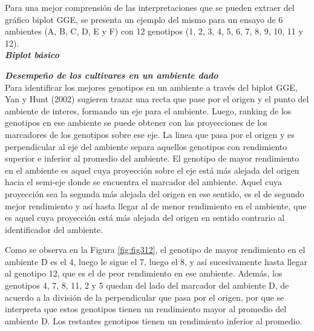 Para una mejor comprensión de las interpretaciones que se pueden extraer del gráfico biplot GGE, se presenta un ejemplo del mismo para un ensayo de 6 ambientes (A, B, C, D, E y F) con 12 genotipos (1, 2, 3, 4, 5, 6, 7, 8, 9, 10, 11 y 12).\\

\textbf{\emph{Biplot básico}}




\textbf{\emph{Desempeño de los cultivares en un ambiente dado}}\\

Para identificar los mejores genotipos en un ambiente a través del biplot GGE, Yan y Hunt (2002) sugieren trazar una recta que pase por el origen y el punto del ambiente de interes, formando un eje para el ambiente. Luego, ranking de los genotipos en ese ambiente se puede obtener con las proyecciones de los marcadores de los genotipos sobre ese eje. La linea que pasa por el origen y es perpendicular al eje del ambiente separa aquellos genotipos con rendimiento superior e inferior al promedio del ambiente. El genotipo de mayor rendimiento en el ambiente es aquel cuya proyección sobre el eje está más alejada del origen hacia el semi-eje donde se encuentra el marcador del ambiente. Aquel cuya proyección sea la segunda más alejada del origen en ese sentido, es el de segundo mejor rendimiento y así hasta llegar al de menor rendimiento en el ambiente, que es aquel cuya proyección está más alejada del origen en sentido contrario al identificador del ambiente. 

Como se observa en la Figura \ref{fig:fig312}, el genotipo de mayor rendimiento en el ambiente D es el 4, luego le sigue el 7, luego el 8, y así sucesivamente hasta llegar al genotipo 12, que es el de peor rendimiento en ese ambiente. Además, 
los genotipos 4, 7, 8, 11, 2 y 5 quedan del lado del marcador del ambiente D, de acuerdo a la división de la perpendicular que pasa por el origen, por que se interpreta que estos genotipos tienen un rendimiento mayor al promedio del ambiente D. Los restantes genotipos tienen un rendimiento inferior al promedio.


